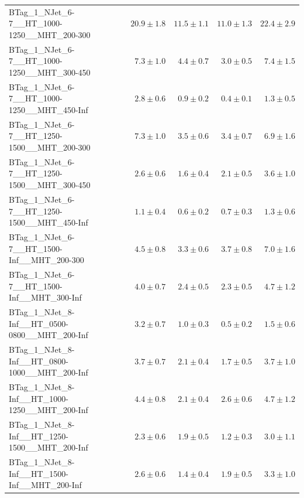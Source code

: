 \documentclass{beamer}
\begin{document}
\begin{frame}
\begin{tabular}{lrrrr}
      BTag\_1\_NJet\_6-7\_\_HT\_1000-1250\_\_MHT\_200-300 &              $20.9\pm1.8$&              $11.5\pm1.1$&              $11.0\pm1.3$&                  $22.4\pm2.9$ \\ 
      BTag\_1\_NJet\_6-7\_\_HT\_1000-1250\_\_MHT\_300-450 &               $7.3\pm1.0$&               $4.4\pm0.7$&               $3.0\pm0.5$&                   $7.4\pm1.5$ \\ 
      BTag\_1\_NJet\_6-7\_\_HT\_1000-1250\_\_MHT\_450-Inf &               $2.8\pm0.6$&               $0.9\pm0.2$&               $0.4\pm0.1$&                   $1.3\pm0.5$ \\ 
      BTag\_1\_NJet\_6-7\_\_HT\_1250-1500\_\_MHT\_200-300 &               $7.3\pm1.0$&               $3.5\pm0.6$&               $3.4\pm0.7$&                   $6.9\pm1.6$ \\ 
      BTag\_1\_NJet\_6-7\_\_HT\_1250-1500\_\_MHT\_300-450 &               $2.6\pm0.6$&               $1.6\pm0.4$&               $2.1\pm0.5$&                   $3.6\pm1.0$ \\ 
      BTag\_1\_NJet\_6-7\_\_HT\_1250-1500\_\_MHT\_450-Inf &               $1.1\pm0.4$&               $0.6\pm0.2$&               $0.7\pm0.3$&                   $1.3\pm0.6$ \\ 
       BTag\_1\_NJet\_6-7\_\_HT\_1500-Inf\_\_MHT\_200-300 &               $4.5\pm0.8$&               $3.3\pm0.6$&               $3.7\pm0.8$&                   $7.0\pm1.6$ \\ 
       BTag\_1\_NJet\_6-7\_\_HT\_1500-Inf\_\_MHT\_300-Inf &               $4.0\pm0.7$&               $2.4\pm0.5$&               $2.3\pm0.5$&                   $4.7\pm1.2$ \\ 
    BTag\_1\_NJet\_8-Inf\_\_HT\_0500-0800\_\_MHT\_200-Inf &               $3.2\pm0.7$&               $1.0\pm0.3$&               $0.5\pm0.2$&                   $1.5\pm0.6$ \\ 
    BTag\_1\_NJet\_8-Inf\_\_HT\_0800-1000\_\_MHT\_200-Inf &               $3.7\pm0.7$&               $2.1\pm0.4$&               $1.7\pm0.5$&                   $3.7\pm1.0$ \\ 
    BTag\_1\_NJet\_8-Inf\_\_HT\_1000-1250\_\_MHT\_200-Inf &               $4.4\pm0.8$&               $2.1\pm0.4$&               $2.6\pm0.6$&                   $4.7\pm1.2$ \\ 
    BTag\_1\_NJet\_8-Inf\_\_HT\_1250-1500\_\_MHT\_200-Inf &               $2.3\pm0.6$&               $1.9\pm0.5$&               $1.2\pm0.3$&                   $3.0\pm1.1$ \\ 
     BTag\_1\_NJet\_8-Inf\_\_HT\_1500-Inf\_\_MHT\_200-Inf &               $2.6\pm0.6$&               $1.4\pm0.4$&               $1.9\pm0.5$&                   $3.3\pm1.0$ \\ 

\bottomrule 
\end{tabular}
\end{frame}
\end{document}
